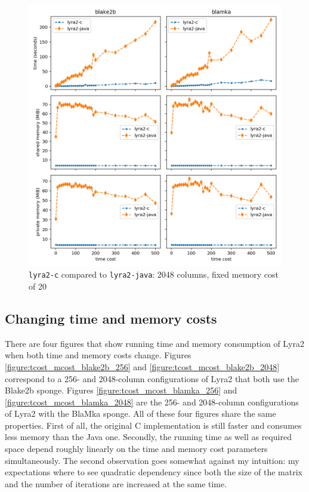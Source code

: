 \begin{figure}[H]
    \centering
    \includegraphics[width=\linewidth]{figures/tcost_2048}
    \caption{\texttt{lyra2-c} compared to \texttt{lyra2-java}: 2048 columns, fixed memory cost of 20}
    \label{figure:tcost_2048}
\end{figure}

\subsection{Changing time and memory costs}

There are four figures that show running time and memory consumption of Lyra2 when both time and memory costs change. Figures \ref{figure:tcost_mcost_blake2b_256} and \ref{figure:tcost_mcost_blake2b_2048} correspond to a 256- and 2048-column configurations of Lyra2 that both use the Blake2b sponge. Figures \ref{figure:tcost_mcost_blamka_256} and \ref{figure:tcost_mcost_blamka_2048} are the 256- and 2048-column configurations of Lyra2 with the BlaMka sponge. All of these four figures share the same properties. First of all, the original C implementation is still faster and consumes less memory than the Java one. Secondly, the running time as well as required space depend roughly linearly on the time and memory cost parameters simultaneously. The second observation goes somewhat against my intuition: my expectations where to see quadratic dependency since both the size of the matrix and the number of iterations are increased at the same time.

